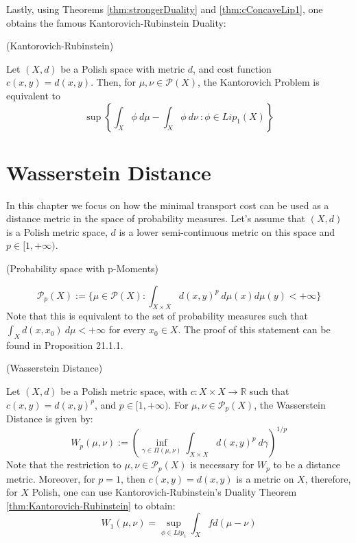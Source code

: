 Lastly, using  Theorems
\ref{thm:strongerDuality} and \ref{thm:cConcaveLip1}, one obtains the famous
Kantorovich-Rubinstein Duality:

\begin{theorem}(Kantorovich-Rubinstein)

  Let $(X,d)$ be a Polish space with metric $d$, and cost function $c(x,y) = d(x,y)$.
  Then, for $\mu, \nu \in \mathcal P(X)$, the Kantorovich Problem
  is equivalent to
  \begin{equation}
      \sup \left \{
      \int_X \phi \ d\mu - \int_X \phi \ d\nu \ :
      \phi \in Lip_1(X)
      \right \}
  \end{equation}
  \label{thm:Kantorovich-Rubinstein}
\end{theorem}

\newpage
\chapter{Wasserstein Distance}

In this chapter we focus on how the minimal transport cost can be used as a distance metric
in the space of probability measures. Let's assume that $(X,d)$ is a Polish metric space,
$d$ is a lower semi-continuous metric on this space and $ p \in [1,+\infty)$.

\begin{definition}(Probability space with p-Moments)

  \begin{equation}
    \mathcal P_p(X) := \{
         \mu \in \mathcal P(X): \int_{X \times X} d(x,y)^p \ d \mu(x) d \mu(y) < +\infty
      \}
  \label{eq:Pp}
  \end{equation}
  Note that this is equivalent to the set of probability measures such that $\int_X d(x,x_0) \ d\mu<+\infty$
  for every $x_0 \in X$. The proof of this statement can be found
  in \citet{garling2018analysis} Proposition 21.1.1.
\end{definition}

\begin{definition}(Wasserstein Distance)

  Let $(X,d)$ be a Polish metric space, with $c:X \times X \to \mathbb R$ such that $c(x,y)=d(x,y)^p$, and
  $p \in [1,+\infty)$.
  For $\mu,\nu \in \mathcal P_p(X)$, the Wasserstein Distance is given by:
  \begin{equation}
    W_p(\mu,\nu) :=
    \left(
    \inf_{\gamma \in \Pi(\mu,\nu)}
    \int_{X \times X} d(x,y)^p \ d\gamma
    \right)^{1/p}
    \label{def:Wasserstein}
  \end{equation}
  Note that the restriction to $\mu,\nu \in \mathcal P_p(X)$ is necessary for $W_p$ to be a distance metric.
  Moreover, for $p=1$, then $c(x,y) = d(x,y)$ is a metric on $X$, therefore, for $X$ Polish, one can
  use Kantorovich-Rubinstein's Duality Theorem \ref{thm:Kantorovich-Rubinstein} to obtain:
  \begin{equation}
    W_1(\mu,\nu) =
    \sup_{\phi \in Lip_1} \int_X f d (\mu - \nu)
  \end{equation}
\end{definition}

